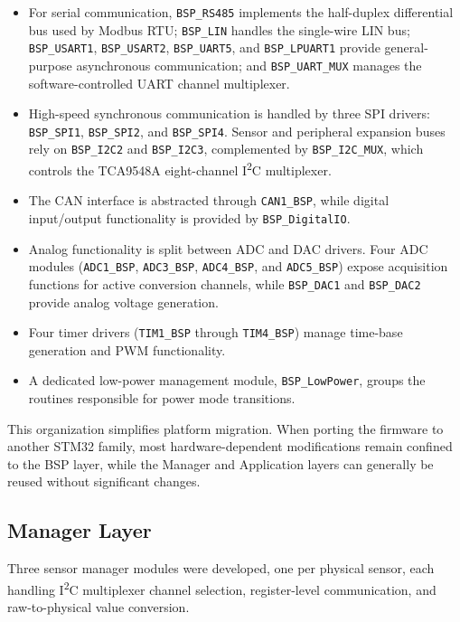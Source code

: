 \begin{itemize}
    \item For serial communication, \texttt{BSP\_RS485} implements the half-duplex differential bus used by Modbus RTU; \texttt{BSP\_LIN} handles the single-wire LIN bus; \texttt{BSP\_USART1}, \texttt{BSP\_USART2}, \texttt{BSP\_UART5}, and \texttt{BSP\_LPUART1} provide general-purpose asynchronous communication; and \texttt{BSP\_UART\_MUX} manages the software-controlled UART channel multiplexer.

    \item High-speed synchronous communication is handled by three SPI drivers: \texttt{BSP\_SPI1}, \texttt{BSP\_SPI2}, and \texttt{BSP\_SPI4}. Sensor and peripheral expansion buses rely on \texttt{BSP\_I2C2} and \texttt{BSP\_I2C3}, complemented by \texttt{BSP\_I2C\_MUX}, which controls the TCA9548A eight-channel I\textsuperscript{2}C multiplexer.

    \item The CAN interface is abstracted through \texttt{CAN1\_BSP}, while digital input/output functionality is provided by \texttt{BSP\_DigitalIO}.

    \item Analog functionality is split between ADC and DAC drivers. Four ADC modules (\texttt{ADC1\_BSP}, \texttt{ADC3\_BSP}, \texttt{ADC4\_BSP}, and \texttt{ADC5\_BSP}) expose acquisition functions for active conversion channels, while \texttt{BSP\_DAC1} and \texttt{BSP\_DAC2} provide analog voltage generation.

    \item Four timer drivers (\texttt{TIM1\_BSP} through \texttt{TIM4\_BSP}) manage time-base generation and PWM functionality.

    \item A dedicated low-power management module, \texttt{BSP\_LowPower}, groups the routines responsible for power mode transitions.
\end{itemize}

This organization simplifies platform migration. When porting the firmware to another STM32 family, most hardware-dependent modifications remain confined to the BSP layer, while the Manager and Application layers can generally be reused without significant changes.

\subsection{Manager Layer}
Three sensor manager modules were developed, one per physical sensor, each
handling I\textsuperscript{2}C multiplexer channel selection, register-level communication, and
raw-to-physical value conversion.

